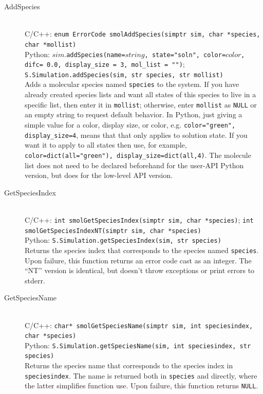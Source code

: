 \documentclass {scrbook}
\newcommand {\ttt} {\texttt}
\begin{document}
\begin{description}

\item[AddSpecies]
\hfill \\
C/C++: \ttt{enum ErrorCode smolAddSpecies(simptr sim, char *species, char *mollist)}\\
Python: $sim$.\ttt{addSpecies(name=$string$, state="soln", color=$color$, difc= 0.0, display\_size = 3, mol\_list = "")}; \ttt{S.Simulation.addSpecies(sim, str species, str mollist)}\\
Adds a molecular species named \ttt{species} to the system. If you have already created species lists and want all states of this species to live in a specific list, then enter it in \ttt{mollist}; otherwise, enter \ttt{mollist} as \ttt{NULL} or an empty string to request default behavior. In Python, just giving a simple value for a color, display size, or color, e.g. \ttt{color="green", display\_size=4}, means that that only applies to solution state. If you want it to apply to all states then use, for example, \ttt{color=dict(all="green"), display\_size=dict(all,4)}. The molecule list does not need to be declared beforehand for the user-API Python version, but does for the low-level API version.

\item[GetSpeciesIndex]
\hfill \\
C/C++: \ttt{int smolGetSpeciesIndex(simptr sim, char *species)}; \ttt{int smolGetSpeciesIndexNT(simptr sim, char *species)}\\
Python: \ttt{S.Simulation.getSpeciesIndex(sim, str species)}\\
Returns the species index that corresponds to the species named \ttt{species}. Upon failure, this function returns an error code cast as an integer. The ``NT'' version is identical, but doesn't throw exceptions or print errors to stderr.

\item[GetSpeciesName]
\hfill \\
C/C++: \ttt{char* smolGetSpeciesName(simptr sim, int speciesindex, char *species)}\\
Python: \ttt{S.Simulation.getSpeciesName(sim, int speciesindex, str species)}\\
Returns the species name that corresponds to the species index in \ttt{speciesindex}. The name is returned both in \ttt{species} and directly, where the latter simplifies function use. Upon failure, this function returns \ttt{NULL}.


\end{description}
\end{document}
